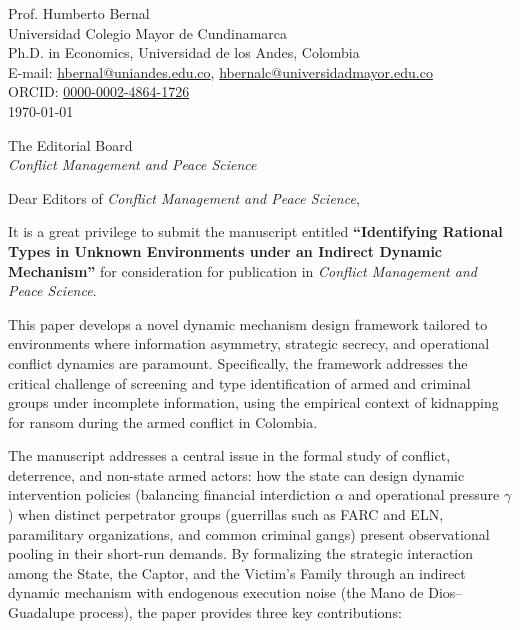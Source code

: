 \documentclass[12pt]{article}
\begin{document}
\singlespacing

\begin{flushright}
Prof. Humberto Bernal \\
Universidad Colegio Mayor de Cundinamarca \\
Ph.D. in Economics, Universidad de los Andes, Colombia \\
E-mail: \href{mailto:hbernal@uniandes.edu.co}{hbernal@uniandes.edu.co}, \href{mailto:hbernalc@universidadmayor.edu.co}{hbernalc@universidadmayor.edu.co} \\
ORCID: \href{https://orcid.org/0000-0002-4864-1726}{0000-0002-4864-1726} \\
\today
\end{flushright}

\vspace{1.5em}

\begin{flushleft}
The Editorial Board \\
\textit{Conflict Management and Peace Science}
\end{flushleft}

\vspace{1.5em}

\noindent Dear Editors of \textit{Conflict Management and Peace Science},

\vspace{1.5em}

\noindent It is a great privilege to submit the manuscript entitled \textbf{``Identifying Rational Types in Unknown Environments under an Indirect Dynamic Mechanism''} for consideration for publication in \textit{Conflict Management and Peace Science}.

This paper develops a novel dynamic mechanism design framework tailored to environments where information asymmetry, strategic secrecy, and operational conflict dynamics are paramount. Specifically, the framework addresses the critical challenge of screening and type identification of armed and criminal groups under incomplete information, using the empirical context of kidnapping for ransom during the armed conflict in Colombia.

The manuscript addresses a central issue in the formal study of conflict, deterrence, and non-state armed actors: how the state can design dynamic intervention policies (balancing financial interdiction $\alpha$ and operational pressure $\gamma$) when distinct perpetrator groups (guerrillas such as FARC and ELN, paramilitary organizations, and common criminal gangs) present observational pooling in their short-run demands. By formalizing the strategic interaction among the State, the Captor, and the Victim's Family through an indirect dynamic mechanism with endogenous execution noise (the Mano de Dios--Guadalupe process), the paper provides three key contributions:
\end{document}

